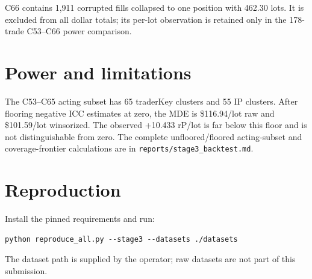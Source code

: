 \documentclass[11pt]{article}
\begin{document}
C66 contains 1,911 corrupted fills collapsed to one position with 462.30 lots. It is excluded from all dollar totals; its per-lot observation is retained only in the 178-trade C53--C66 power comparison.

\section*{Power and limitations}
The C53--C65 acting subset has 65 traderKey clusters and 55 IP clusters. After flooring negative ICC estimates at zero, the MDE is \$116.94/lot raw and \$101.59/lot winsorized. The observed +10.433 rP/lot is far below this floor and is not distinguishable from zero. The complete unfloored/floored acting-subset and coverage-frontier calculations are in \texttt{reports/stage3\_backtest.md}.

\section*{Reproduction}
Install the pinned requirements and run:
\begin{verbatim}
python reproduce_all.py --stage3 --datasets ./datasets
\end{verbatim}
The dataset path is supplied by the operator; raw datasets are not part of this submission.
\end{document}
